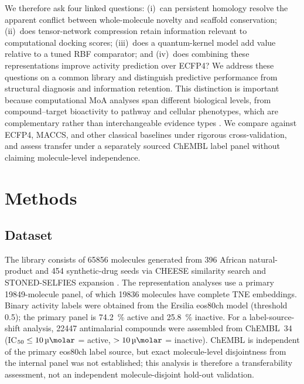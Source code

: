 \documentclass[11pt,a4paper]{article}
\begin{document}
We therefore ask four linked questions: (i)~can persistent homology resolve the apparent conflict between whole-molecule novelty and scaffold conservation; (ii)~does tensor-network compression retain information relevant to computational docking scores; (iii)~does a quantum-kernel model add value relative to a tuned RBF comparator; and (iv)~does combining these representations improve activity prediction over ECFP4? We address these questions on a common library and distinguish predictive performance from structural diagnosis and information retention. This distinction is important because computational MoA analyses span different biological levels, from compound--target bioactivity to pathway and cellular phenotypes, which are complementary rather than interchangeable evidence types \citep{Trapotsi2022MoA}. We compare against ECFP4, MACCS, and other classical baselines under rigorous cross-validation, and assess transfer under a separately sourced ChEMBL label panel without claiming molecule-level independence.


\section{Methods}\label{sec:methods}

\subsection{Dataset}\label{sec:methods_dataset}

The library consists of \num{65856} molecules generated from \num{396} African natural-product and \num{454} synthetic-drug seeds via CHEESE similarity search \citep{lzicar_cheese_2024} and STONED-SELFIES expansion \citep{Nigam2021}. The representation analyses use a primary \num{19849}-molecule panel, of which \num{19836} molecules have complete TNE embeddings. Binary activity labels were obtained from the Ersilia eos80ch model (threshold \num{0.5}); the primary panel is \qty{74.2}{\percent} active and \qty{25.8}{\percent} inactive. For a label-source-shift analysis, \num{22447} antimalarial compounds were assembled from ChEMBL~34 (IC$_{50} \leq \SI{10}{\micro\molar}$ = active, $> \SI{10}{\micro\molar}$ = inactive). ChEMBL is independent of the primary eos80ch label source, but exact molecule-level disjointness from the internal panel was not established; this analysis is therefore a transferability assessment, not an independent molecule-disjoint hold-out validation.
\end{document}
